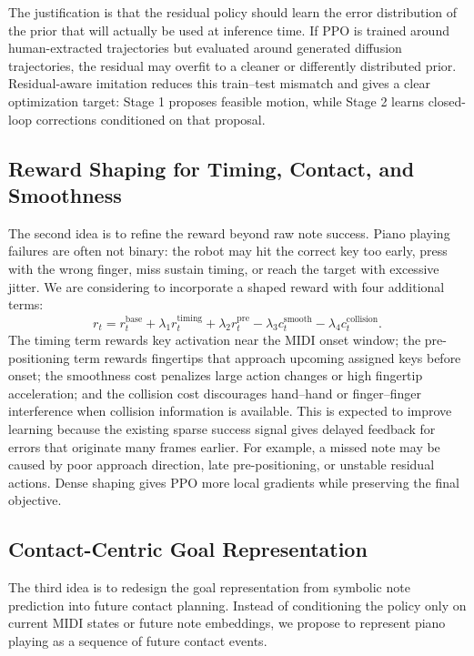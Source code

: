 \documentclass{article}
\begin{document}
The justification is that the residual policy should learn the error distribution of the prior that will actually be used at inference time. If PPO is trained around human-extracted trajectories but evaluated around generated diffusion trajectories, the residual may overfit to a cleaner or differently distributed prior. Residual-aware imitation reduces this train--test mismatch and gives a clear optimization target: Stage 1 proposes feasible motion, while Stage 2 learns closed-loop corrections conditioned on that proposal.

\subsection{Reward Shaping for Timing, Contact, and Smoothness}

The second idea is to refine the reward beyond raw note success. Piano playing failures are often not binary: the robot may hit the correct key too early, press with the wrong finger, miss sustain timing, or reach the target with excessive jitter. We are considering to incorporate a shaped reward with four additional terms:
\begin{equation}
    r_t = r^{\mathrm{base}}_t + \lambda_1 r^{\mathrm{timing}}_t + \lambda_2 r^{\mathrm{pre}}_t - \lambda_3 c^{\mathrm{smooth}}_t - \lambda_4 c^{\mathrm{collision}}_t.
\end{equation}
The timing term rewards key activation near the MIDI onset window; the pre-positioning term rewards fingertips that approach upcoming assigned keys before onset; the smoothness cost penalizes large action changes or high fingertip acceleration; and the collision cost discourages hand--hand or finger--finger interference when collision information is available.
This is expected to improve learning because the existing sparse success signal gives delayed feedback for errors that originate many frames earlier. For example, a missed note may be caused by poor approach direction, late pre-positioning, or unstable residual actions. Dense shaping gives PPO more local gradients while preserving the final objective.

\subsection{Contact-Centric Goal Representation}

The third idea is to redesign the goal representation from symbolic note prediction into future contact planning. Instead of conditioning the policy only on current MIDI states or future note embeddings, we propose to represent piano playing as a sequence of future contact events.
\end{document}
